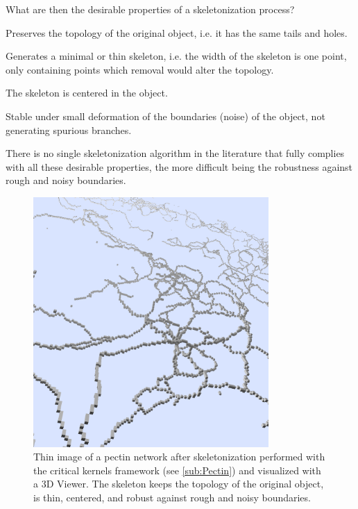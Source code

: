 What are then the desirable properties of a skeletonization process?
\begin{enumerate*}[label=\textbf{\alph*)}]
  \item Preserves the topology of the original object, i.e. it has the same tails
  and holes.
\item Generates a minimal or thin skeleton, i.e. the width of the skeleton is one point, only containing points which removal would alter the topology.
  \item The skeleton is centered in the object.
  \item Stable under small deformation of the boundaries (noise) of the object, not generating spurious branches.
\end{enumerate*}

There is no single skeletonization algorithm in the literature that fully complies with all these desirable properties, the more difficult being the robustness against rough and noisy boundaries.

\begin{figure}[!htb]
  \centering
  \includegraphics[width=0.8\textwidth]{Figures/chapter-image/skeleton_3D_viewer.png}%
  \caption{Thin image of a pectin network after skeletonization performed with the critical kernels framework (see \autoref{sub:Pectin}) and visualized with a 3D Viewer. The skeleton keeps the topology of the original object, is thin, centered, and robust against rough and noisy boundaries.}
  \label{fig:thin_3Dviewer}
\end{figure}

